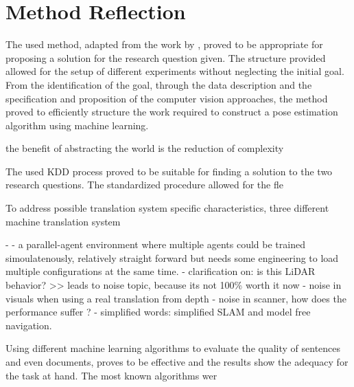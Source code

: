     
    
  

\section{Method Reflection}\label{sec:method-reflection}

    The used method, adapted from the work by \cite{luckert2016using}, proved to be appropriate for proposing a solution for the research question given. The structure provided allowed for the setup of different experiments without neglecting the initial goal. From the identification of the goal, through the data description and the specification and proposition of the computer vision approaches, the method proved to efficiently structure the work required to construct a pose estimation algorithm using machine learning.
    
      the benefit of abstracting the world is the reduction of complexity


    The used KDD process proved to be suitable for ﬁnding a solution to the two research
    questions. The standardized procedure allowed for the ﬂe
    
    
    
    To address possible translation system speciﬁc characteristics, three different machine
    translation system
    
    -
    - a parallel-agent environment where multiple agents could be trained simoulatenously, relatively straight forward but needs some engineering to load multiple configurations at the same time.
    - clarification on: is this LiDAR behavior? >> leads to noise topic, because its not 100\% worth it now
    - noise in visuals when using a real translation from depth
    - noise in scanner, how does the performance suffer ?
    - simplified words: simplified SLAM and model free navigation.
    
    Using different machine learning algorithms to evaluate the quality of sentences and even
    documents, proves to be effective and the results show the adequacy for the task at hand.
    The most known algorithms wer
    

